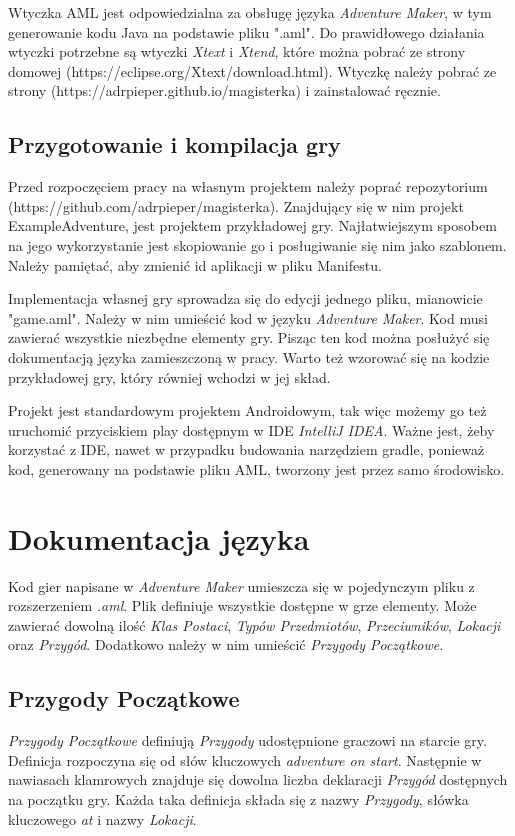 \documentclass[openright]{xmgr}
\begin{document}
Wtyczka AML jest odpowiedzialna za obsługę języka \textit{Adventure Maker}, w tym generowanie kodu Java na podstawie pliku ".aml". Do prawidłowego działania wtyczki potrzebne są wtyczki \textit{Xtext} i \textit{Xtend}, które można pobrać ze strony domowej (https://eclipse.org/Xtext/download.html).
Wtyczkę należy pobrać ze strony (https://adrpieper.github.io/magisterka) i zainstalować ręcznie.

\section{Przygotowanie i kompilacja gry}
Przed rozpoczęciem pracy na własnym projektem należy poprać repozytorium (https://github.com/adrpieper/magisterka). Znajdujący się w nim projekt ExampleAdventure, jest projektem przykładowej gry. Najłatwiejszym sposobem na jego wykorzystanie jest skopiowanie go i posługiwanie się nim jako szablonem. Należy pamiętać, aby zmienić id aplikacji w pliku Manifestu.

Implementacja własnej gry sprowadza się do edycji jednego pliku, mianowicie "game.aml". Należy w nim umieścić kod w języku \textit{Adventure Maker}. Kod musi  zawierać wszystkie niezbędne elementy gry. Pisząc ten kod można posłużyć się dokumentacją języka zamieszczoną w pracy. Warto też wzorować się na kodzie przykładowej gry, który równiej wchodzi w jej skład.

Projekt jest standardowym projektem Androidowym, tak więc możemy go też uruchomić przyciskiem play dostępnym w IDE \textit{IntelliJ IDEA}. Ważne jest, żeby korzystać z IDE, nawet w przypadku budowania narzędziem gradle, ponieważ kod, generowany na podstawie pliku AML, tworzony jest przez samo środowisko.

\chapter{Dokumentacja języka} 
Kod gier napisane w \textit{Adventure Maker} umieszcza się w pojedynczym pliku z rozszerzeniem \textit{.aml}. Plik definiuje wszystkie dostępne w grze elementy. Może zawierać dowolną ilość \textit{Klas Postaci}, \textit{Typów Przedmiotów}, \textit{Przeciwników}, \textit{Lokacji} oraz \textit{Przygód}. Dodatkowo należy w nim umieścić \textit{Przygody Początkowe}. 

\section{Przygody Początkowe} 
\textit{Przygody Początkowe} definiują \textit{Przygody} udostępnione graczowi na starcie gry. Definicja rozpoczyna się od słów kluczowych \textit{adventure on start}. Następnie w nawiasach klamrowych znajduje się dowolna liczba deklaracji \textit{Przygód} dostępnych na początku gry.
Każda taka definicja składa się z nazwy \textit{Przygody}, słówka kluczowego \textit{at} i nazwy \textit{Lokacji}.
\end{document}
